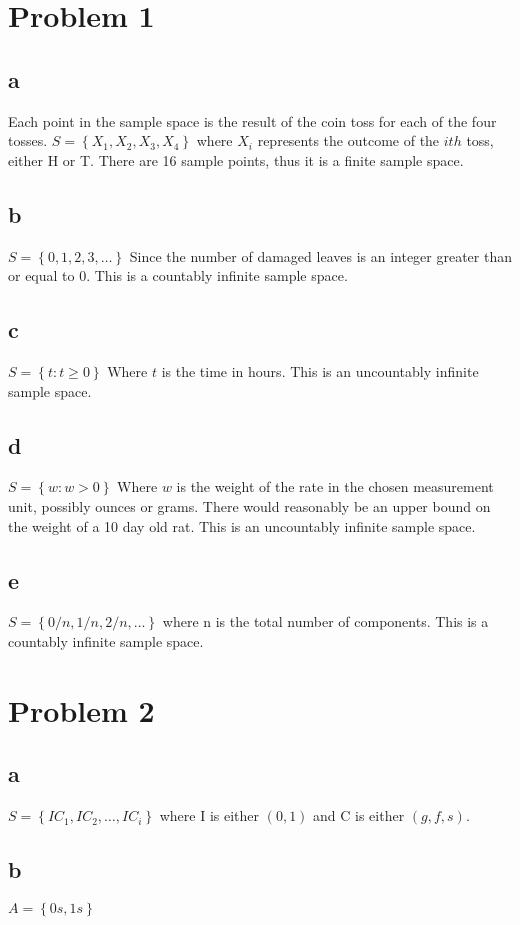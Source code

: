 \documentclass{article}
\begin{document}
\begin{flushleft}
\section*{Problem 1}
\subsection*{a}
Each point in the sample space is the result of the coin toss for each of the four tosses. $S=\left\{X_1,X_2,X_3,X_4 \right\}$ where $X_i$ represents the outcome of the $ith$ toss, either H or T. There are 16 sample points, thus it is a finite sample space.
\subsection*{b}
$S=\left\{0,1,2,3,\dots \right\}$ Since the number of damaged leaves is an integer greater than or equal to 0. This is a countably infinite sample space.
\subsection*{c}
$S=\left\{t:t\geq 0 \right\}$ Where $t$ is the time in hours. This is an uncountably infinite sample space.
\subsection*{d}
$S=\left\{w:w>0 \right\}$ Where $w$ is the weight of the rate in the chosen measurement unit, possibly ounces or grams. There would reasonably be an upper bound on the weight of a 10 day old rat. This is an uncountably infinite sample space.
\subsection*{e}
$S=\left\{0/n,1/n,2/n,\dots \right\}$ where n is the total number of components. This is a countably infinite sample space.

\section*{Problem 2}
\subsection*{a}
$S=\left\{{IC}_1,{IC}_2,\dots,{IC}_i \right\}$
where I is either $(0,1)$ and C is either $(g,f,s)$.
\subsection*{b}
$A=\left\{0s,1s \right\}$

\end{flushleft}
\end{document}
